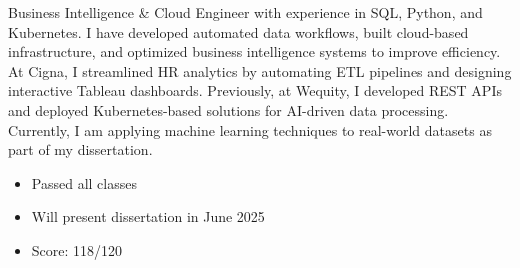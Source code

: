 \documentclass[10pt,a4paper,ragged2e,withhyper]{altacv}
\renewcommand{\cvsectionfont}{\LARGE\rmfamily\bfseries}
\renewcommand{\cvsubsectionfont}{\large\bfseries}
\begin{document}
\thispagestyle{empty}
\clearpage
\makecvheader

\begin{paracol}{2}

\begingroup
\footnotesize
\renewcommand{\cvsectionfont}{\normalsize\bfseries} %
\renewcommand{\cvsubsectionfont}{\small\bfseries}   %




Business Intelligence & Cloud Engineer with experience in SQL, Python, and Kubernetes.
{I have developed automated data workflows, built cloud-based infrastructure, and optimized business intelligence systems to improve efficiency. At Cigna, I streamlined HR analytics by automating ETL pipelines and designing interactive Tableau dashboards. Previously, at Wequity, I developed REST APIs and deployed Kubernetes-based solutions for AI-driven data processing. Currently, I am applying machine learning techniques to real-world datasets as part of my dissertation.}


\scriptsize
{}



\begin{itemize}
  \item {\footnotesize Passed all classes}
  \item {\footnotesize Will present dissertation in June 2025}
\end{itemize}

\begin{itemize}
  \item {\footnotesize Score: 118/120}
\end{itemize}






\end{paracol}
\end{document}
